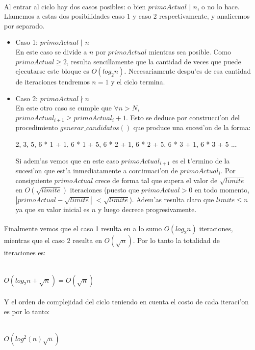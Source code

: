 \paragraph{}
Al entrar al ciclo hay dos casos posibles: o bien $primoActual$ $|$ $n$, o no lo hace. Llamemos a estas dos
posibilidades caso 1 y caso 2 respectivamente, y analicemos por separado.
\begin{itemize}
\item Caso 1: $primoActual$ $|$ $n$ \\
En este caso se divide a $n$ por $primoActual$ mientras sea posible. Como $primoActual \geq 2$, resulta
sencillamente que la cantidad de veces que puede ejecutarse este bloque es $O(log_2 n)$. Necesariamente
despu'es de esa cantidad de iteraciones tendremos $n = 1$ y el ciclo termina.
\item Caso 2: $primoActual \nmid n$\\
En este otro caso se cumple que $\forall n > N$, $primoActual_{i+1} \geq primoActual_i + 1$. Esto se deduce
por construcci'on del procedimiento $generar\_candidatos()$ que produce una sucesi'on de la forma: \\

\centerline{2, 3, 5, 6 * 1 + 1, 6 * 1 + 5, 6 * 2 + 1, 6 * 2 + 5, 6 * 3 + 1, 6 * 3 + 5 ...} 

Si adem'as vemos que en este caso $primoActual_{i+1}$ es el t'ermino de la sucesi'on que est'a 
inmediatamente a continuaci'on de $primoActual_i$. Por consiguiente $primoActual$ crece
de forma tal que supera el valor de $\sqrt{limite}$ en $O(\sqrt{limite})$ iteraciones (puesto
que $primoActual > 0$ en todo momento, $|primoActual - \sqrt{limite}|$ $< \sqrt{limite}$).
Adem'as resulta claro que $limite \leq n$ ya que su valor inicial es $n$ y luego decrece
progresivamente.
\end{itemize}

\paragraph{}
Finalmente vemos que el caso 1 resulta en a lo sumo $O(log_2 n)$ iteraciones, mientras que
el caso 2 resulta en $O(\sqrt{n})$. Por lo tanto la totalidad de iteraciones es:\\
\\
\centerline{$O(log_2 n + \sqrt{n}) = O(\sqrt{n})$}
\paragraph{}
Y el orden de complejidad del ciclo teniendo en cuenta el costo de cada iteraci'on es por lo tanto:\\
\\
\centerline{$O(log^2 (n) \sqrt{n})$}
